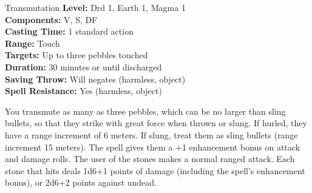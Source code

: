 {Transmutation}
{
	\textbf{Level:}
	Drd 1, Earth 1, Magma 1\\
	\textbf{Components:}
	V, S, DF\\
	\textbf{Casting Time:}
	1 standard action\\
	\textbf{Range:}
	Touch\\
	\textbf{Targets:}
	Up to three pebbles touched\\
	\textbf{Duration:}
	30 minutes or until discharged\\
	\textbf{Saving Throw:}
	Will negates (harmless, object)\\
	\textbf{Spell Resistance:}
	Yes (harmless, object)\\
}
{
	You transmute as many as three pebbles, which can be no larger than sling bullets, so that they strike with great force when thrown or slung. If hurled, they have a range increment of 6 meters. If slung, treat them as sling bullets (range increment 15 meters). The spell gives them a +1 enhancement bonus on attack and damage rolls. The user of the stones makes a normal ranged attack. Each stone that hits deals 1d6+1 points of damage (including the spell's enhancement bonus), or 2d6+2 points against undead.

}
